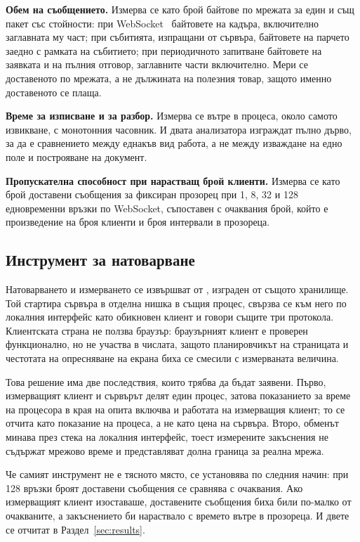 \textbf{Обем на съобщението.} Измерва се като брой байтове по мрежата за един и същ пакет
със стойности: при WebSocket~\cite{rfc6455} байтовете на кадъра, включително заглавната му
част; при събитията, изпращани от сървъра, байтовете на парчето заедно с рамката на
събитието; при периодичното запитване байтовете на заявката и на пълния отговор, заглавните
части включително. Мери се доставеното по мрежата, а не дължината на полезния товар, защото
именно доставеното се плаща.

\textbf{Време за изписване и за разбор.} Измерва се вътре в процеса, около самото
извикване, с монотонния часовник. И двата анализатора изграждат пълно дърво, за да е
сравнението между еднакъв вид работа, а не между изваждане на едно поле и построяване на
документ.

\textbf{Пропускателна способност при нарастващ брой клиенти.} Измерва се като брой
доставени съобщения за фиксиран прозорец при 1, 8, 32 и 128 едновременни връзки по
WebSocket, съпоставен с очаквания брой, който е произведение на броя клиенти и броя
интервали в прозореца.

\subsection{Инструмент за натоварване}

Натоварването и измерването се извършват от , изграден от същото
хранилище. Той стартира сървъра в отделна нишка в същия процес, свързва се към него по
локалния интерфейс като обикновен клиент и говори същите три протокола. Клиентската страна
не ползва браузър: браузърният клиент е проверен функционално, но не участва в числата,
защото планировчикът на страницата и честотата на опресняване на екрана биха се смесили с
измерваната величина.

Това решение има две последствия, които трябва да бъдат заявени. Първо, измерващият клиент
и сървърът делят един процес, затова показанието за време на процесора в края на опита
включва и работата на измерващия клиент; то се отчита като показание на процеса, а не като
цена на сървъра. Второ, обменът минава през стека на локалния интерфейс, тоест измерените
закъснения не съдържат мрежово време и представляват долна граница за реална мрежа.

Че самият инструмент не е тясното място, се установява по следния начин: при 128 връзки
броят доставени съобщения се сравнява с очаквания. Ако измерващият клиент изоставаше,
доставените съобщения биха били по-малко от очакваните, а закъснението би нараствало с
времето вътре в прозореца. И двете се отчитат в Раздел~\ref{sec:results}.

